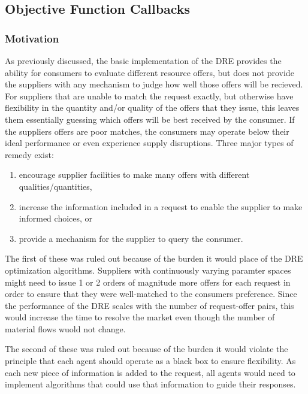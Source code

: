 \subsection{Objective Function Callbacks}\label{subsection:callback}

\subsubsection{Motivation}

As previously discussed, the basic implementation of the \gls{DRE} provides
the ability for consumers to evaluate different resource offers, but does not
provide the suppliers with any mechanism to judge how well those offers will
be recieved.  For suppliers that are unable to match the request exactly, but
otherwise have flexibility in the quantity and/or quality of the offers that
they issue, this leaves them essentially guessing which offers will be best
received by the consumer.  If the suppliers offers are poor matches, the
consumers may operate below their ideal performance or even experience supply
disruptions.  Three major types of remedy exist:
\begin{enumerate}
\item encourage supplier facilities to make many offers with different
  qualities/quantities,
\item increase the information included in a request to enable the supplier to
  make informed choices, or
\item provide a mechanism for the supplier to query the consumer.
\end{enumerate}

The first of these was ruled out because of the burden it would place of the
\gls{DRE} optimization algorithms.  Suppliers with continuously varying
paramter spaces might need to issue 1 or 2 orders of magnitude more offers for
each request in order to ensure that they were well-matched to the consumers
preference.  Since the performance of the \gls{DRE} scales with the number of
request-offer pairs, this would increase the time to resolve the market even
though the number of material flows wuold not change.

The second of these was ruled out because of the burden it would violate the
\Cyclus{} principle that each agent should operate as a black box to ensure
flexibility.  As each new piece of information is added to the request, all
agents would need to implement algorithms that could use that information to
guide their responses.  

